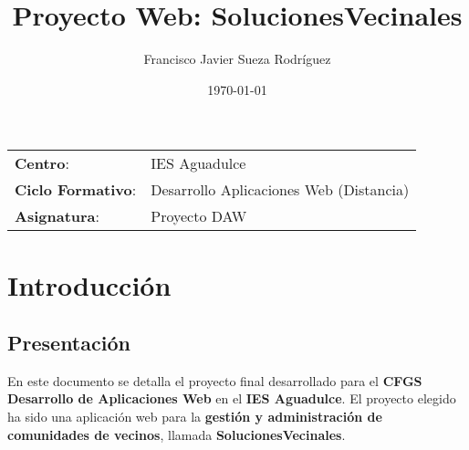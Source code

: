 


\title{
\vspace{10ex}
\normalfont \normalsize
\huge \textbf{Proyecto Web: SolucionesVecinales}
}
\author{Francisco Javier Sueza Rodríguez}
\date{\normalsize\today}

\glsenablehyper
\makeglossaries
{}




\maketitle

\thispagestyle{empty}

\vspace{75ex}

\begin{center}
    \begin{tabular}{l l}
        \textbf{Centro}: & IES Aguadulce \\
        \textbf{Ciclo Formativo}: & Desarrollo Aplicaciones Web (Distancia)\\
        \textbf{Asignatura}: & Proyecto DAW\\
    \end{tabular}
\end{center}

\newpage

\begingroup
\hypersetup{linkcolor=black}
\tableofcontents
\endgroup

\newpage

\begingroup
\hypersetup{linkcolor=black}
\listoffigures
\listoftables
\endgroup

\newpage

\section{Introducción}

\subsection{Presentación}
En este documento se detalla el proyecto final desarrollado para el \textbf{CFGS Desarrollo de Aplicaciones Web} en el \textbf{IES Aguadulce}. El proyecto elegido ha sido una aplicación web para la \textbf{gestión y administración de comunidades de vecinos}, llamada \textbf{SolucionesVecinales}.

